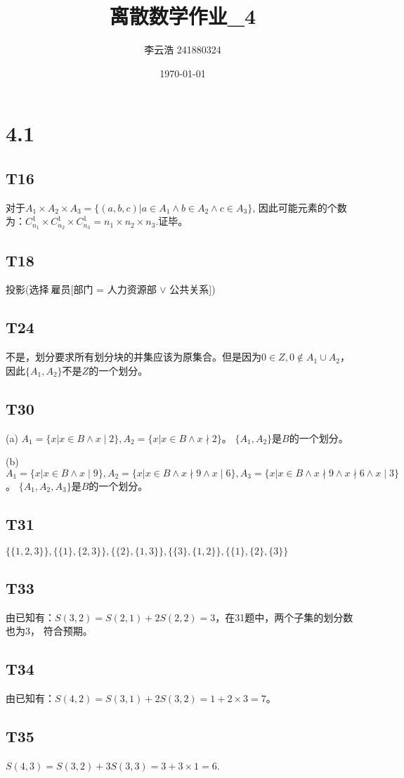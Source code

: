 \documentclass{article}
\title{离散数学作业\_4}
\author{李云浩 241880324}
\date{\today}
\begin{document}
\maketitle
\section{4.1}
\subsection{T16}
对于$A_1 \times A_2 \times A_3 = \{(a, b, c) | a \in A_1 \land b \in A_2 \land c \in A_3\}$,
因此可能元素的个数为：$C_{n_1}^1 \times C_{n_2}^1 \times C_{n_3}^1 = n_1 \times n_2 \times n_3$.证毕。
\subsection{T18}
投影(选择$\ $雇员[部门 = 人力资源部 $\lor$ 公共关系])
\subsection{T24}
不是，划分要求所有划分块的并集应该为原集合。但是因为$0 \in Z, 0 \notin A_1 \cup A_2$，
因此$\{A_1, A_2\}$不是$Z$的一个划分。
\subsection{T30}
(a) $A_1 = \{x | x \in B \land x \mid 2\}, A_2 = \{x | x \in B \land x \nmid 2\}$。
$\{A_1, A_2\}$是$B$的一个划分。

(b) $A_1 = \{x | x \in B \land x \mid 9\}, A_2 = \{x | x \in B \land x \nmid 9 \land x \mid 6\},
A_3 = \{x | x \in B \land x \nmid 9 \land x \nmid 6 \land x \mid 3\}$。
$\{A_1, A_2, A_3\}$是$B$的一个划分。
\subsection{T31}
$\{\{1, 2, 3\}\}, \{\{1\}, \{2, 3\}\}, \{\{2\}, \{1, 3\}\}, \{\{3\}, \{1, 2\}\}, 
\{\{1\}, \{2\}, \{3\}\}$
\subsection{T33}
由已知有：$S(3, 2) = S(2, 1) + 2S(2, 2) = 3$，在31题中，两个子集的划分数也为3，
符合预期。
\subsection{T34}
由已知有：$S(4, 2) = S(3, 1) + 2S(3, 2) = 1 + 2 \times 3 = 7$。
\subsection{T35}
$S(4, 3) = S(3, 2) + 3S(3 , 3) = 3 + 3 \times 1 = 6$.
\end{document}
